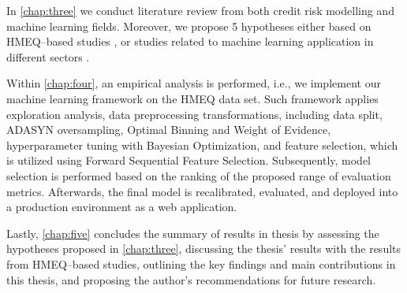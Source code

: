 In \autoref{chap:three} we conduct literature review from both credit risk modelling and machine learning fields. Moreover, we propose 5 hypotheses either based on HMEQ--based studies \citep{serkan2021bagging, zurada2014classification}, or studies related to machine learning application in different sectors \citep{de2023predicting, pintelas2020grey, wu2018accurate}.


Within \autoref{chap:four}, an empirical analysis is performed, i.e., we implement our machine learning framework on the HMEQ data set.
Such framework applies exploration analysis, data preprocessing transformations, including data split, ADASYN oversampling, Optimal Binning and Weight of Evidence, hyperparameter tuning with Bayesian Optimization, and feature selection, which is utilized using Forward Sequential Feature Selection.
Subsequently, model selection is performed based on the ranking of the proposed range of evaluation metrics.
Afterwards, the final model is recalibrated, evaluated, and deployed into a production environment as a web application.


Lastly, \autoref{chap:five} concludes the summary of results in thesis by assessing the hypotheses proposed in \autoref{chap:three}, discussing the thesis' results with the results from HMEQ--based studies, outlining the key findings and main contributions in this thesis, and proposing the author's recommendations for future research.

